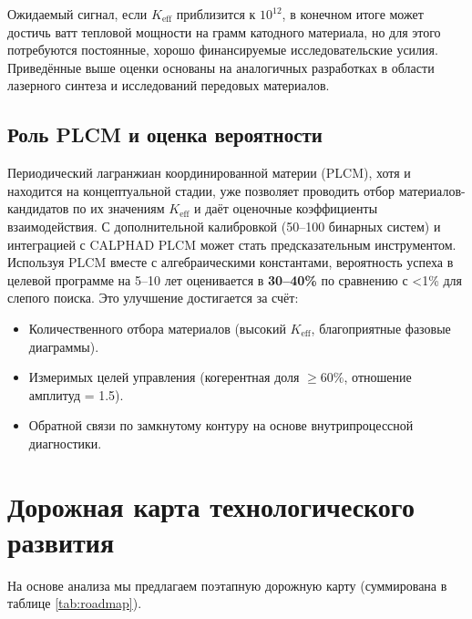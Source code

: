 \documentclass[12pt]{article}
\theoremstyle{remark}
\newcommand{\Keff}{K_{\mathrm{eff}}}
\begin{document}
	Ожидаемый сигнал, если \(\Keff\) приблизится к \(10^{12}\), в конечном итоге может достичь ватт тепловой мощности на грамм катодного материала, но для этого потребуются постоянные, хорошо финансируемые исследовательские усилия. Приведённые выше оценки основаны на аналогичных разработках в области лазерного синтеза и исследований передовых материалов.
	
	\subsection{Роль PLCM и оценка вероятности}
	
	Периодический лагранжиан координированной материи (PLCM), хотя и находится на концептуальной стадии, уже позволяет проводить отбор материалов-кандидатов по их значениям \(K_{\mathrm{eff}}\) и даёт оценочные коэффициенты взаимодействия. С дополнительной калибровкой (50–100 бинарных систем) и интеграцией с CALPHAD PLCM может стать предсказательным инструментом. Используя PLCM вместе с алгебраическими константами, вероятность успеха в целевой программе на 5–10 лет оценивается в \textbf{30–40\%} по сравнению с <1\% для слепого поиска. Это улучшение достигается за счёт:
	\begin{itemize}
		\item Количественного отбора материалов (высокий \(K_{\mathrm{eff}}\), благоприятные фазовые диаграммы).
		\item Измеримых целей управления (когерентная доля \(\geq 60\%\), отношение амплитуд = 1.5).
		\item Обратной связи по замкнутому контуру на основе внутрипроцессной диагностики.
	\end{itemize}
	
	\section{Дорожная карта технологического развития}
	\label{sec:roadmap}
	
	На основе анализа мы предлагаем поэтапную дорожную карту (суммирована в таблице \ref{tab:roadmap}).
	
\end{document}
